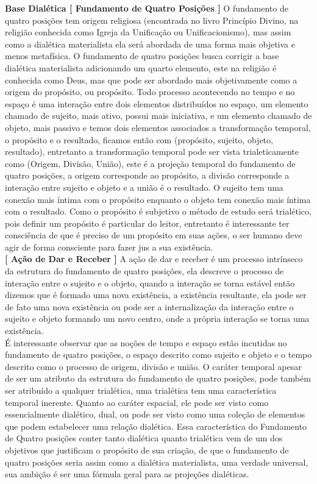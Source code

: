 \textbf{Base Dialética [ Fundamento de Quatro Posições ]} O fundamento de quatro posições tem origem religiosa (encontrada no livro Princípio Divino, na religião conhecida como Igreja da Unificação ou Unificacionismo), mas assim como a dialética materialista ela será abordada de uma forma mais objetiva e menos metafísica. O fundamento de quatro posições busca corrigir a base dialética materialista adicionando um quarto elemento, este na religião é conhecida como Deus, mas que pode ser abordado mais objetivamente como a origem do propósito, ou propósito. Todo processo acontecendo no tempo e no espaço é uma interação entre dois elementos distribuídos no espaço, um elemento chamado de sujeito, mais ativo, possui mais iniciativa, e um elemento chamado de objeto, mais passivo e temos dois elementos associados a transformação temporal, o propósito e o resultado, ficamos então com (propósito, sujeito, objeto, resultado), entretanto a transformação temporal pode ser vista trialeticamente como (Origem, Divisão, União), este é a projeção temporal do fundamento de quatro posições, a origem corresponde ao propósito, a divisão corresponde a interação entre sujeito e objeto e a união é o resultado. O sujeito tem uma conexão mais íntima com o propósito enquanto o objeto tem conexão mais íntima com o resultado. Como o propósito é subjetivo o método de estudo será trialético, pois definir um propósito é particular do leitor, entretanto é interessante ter consciência de que é preciso de um propósito em suas ações, o ser humano deve agir de forma consciente para fazer jus a sua existência.\\

\textbf{[ Ação de Dar e Receber ]} A ação de dar e receber é um processo intrínseco da estrutura do fundamento de quatro posições, ela descreve o processo de interação entre o sujeito e o objeto, quando a interação se torna estável então dizemos que é formado uma nova existência, a existência resultante, ela pode ser de fato uma nova existência ou pode ser a internalização da interação entre o sujeito e objeto formando um novo centro, onde a própria interação se torna uma existência.\\

É interessante observar que as noções de tempo e espaço estão incutidas no fundamento de quatro posições, o espaço descrito como sujeito e objeto e o tempo descrito como o processo de origem, divisão e união. O caráter temporal apesar de ser um atributo da estrutura do fundamento de quatro posições, pode também ser atribuído a qualquer trialética, uma trialética tem uma característica temporal inerente. Quanto ao caráter espacial, ele pode ser visto como essencialmente dialético, dual, ou pode ser visto como uma coleção de elementos que podem estabelecer uma relação dialética. Essa característica do Fundamento de Quatro posições conter tanto dialética quanto trialética vem de um dos objetivos que justificam o propósito de sua criação, de que o fundamento de quatro posições seria assim como a dialética materialista, uma verdade universal, sua ambição é ser uma fórmula geral para as projeções dialéticas.


